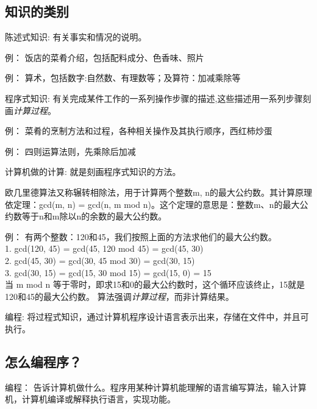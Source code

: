 \subsection{知识的类别}
\begin{description}
\item{陈述式知识:} 有关事实和情况的说明。
  \begin{compactenum}
  \item 例： 饭店的菜肴介绍，包括配料成分、色香味、照片
  \item 例： 算术，包括数字:自然数、有理数等；及算符：加减乘除等
  \end{compactenum}
\item{程序式知识:} 有关完成某件工作的一系列操作步骤的描述,这些描述用一系列步骤刻画\emph{计算过程}。
  \begin{compactenum}
  \item 例： 菜肴的烹制方法和过程，各种相关操作及其执行顺序，西红柿炒蛋
  \item 例： 四则运算法则，先乘除后加减
  \end{compactenum}
\item {计算机做的计算:} 就是刻画程序式知识的方法。
  \begin{compactenum}
  \item 欧几里德算法又称辗转相除法，用于计算两个整数m, n的最大公约数。其计算原理依定理：gcd(m, n) = gcd(n, m mod n)。这个定理的意思是：整数m、n的最大公约数等于n和m除以n的余数的最大公约数。
  \item 例： 有两个整数：120和45，我们按照上面的方法求他们的最大公约数。 \\
    1. gcd(120, 45) = gcd(45, 120 mod 45) = gcd(45, 30) \\
    2. gcd(45, 30) = gcd(30, 45 mod 30) = gcd(30, 15) \\
    3. gcd(30, 15) = gcd(15, 30 mod 15) = gcd(15, 0) = 15 \\
    当 m mod n 等于零时，即求15和0的最大公约数时，这个循环应该终止，15就是120和45的最大公约数。
    算法强调\emph{计算过程}，而非计算结果。
  \end{compactenum}
\item {编程:} 将过程式知识，通过计算机程序设计语言表示出来，存储在文件中，并且可执行。
\end{description}
\subsection{怎么编程序？}
编程： 告诉计算机做什么。程序用某种计算机能理解的语言编写算法，输入计算机，计算机编译或解释执行语言，实现功能。

